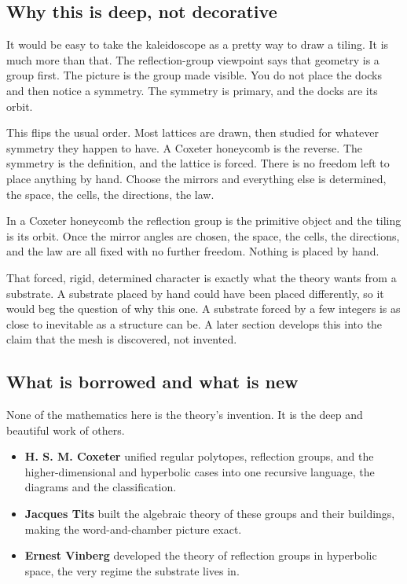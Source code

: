 \subsection{Why this is deep, not decorative}

It would be easy to take the kaleidoscope as a pretty way to draw a tiling. It is much more than that. The reflection-group viewpoint says that geometry is a group first. The picture is the group made visible. You do not place the docks and then notice a symmetry. The symmetry is primary, and the docks are its orbit.

This flips the usual order. Most lattices are drawn, then studied for whatever symmetry they happen to have. A Coxeter honeycomb is the reverse. The symmetry is the definition, and the lattice is forced. There is no freedom left to place anything by hand. Choose the mirrors and everything else is determined, the space, the cells, the directions, the law.

\begin{proposition}
In a Coxeter honeycomb the reflection group is the primitive object and the tiling is its orbit. Once the mirror angles are chosen, the space, the cells, the directions, and the law are all fixed with no further freedom. Nothing is placed by hand.
\end{proposition}

That forced, rigid, determined character is exactly what the theory wants from a substrate. A substrate placed by hand could have been placed differently, so it would beg the question of why this one. A substrate forced by a few integers is as close to inevitable as a structure can be. A later section develops this into the claim that the mesh is discovered, not invented.

\subsection{What is borrowed and what is new}

None of the mathematics here is the theory's invention. It is the deep and beautiful work of others.

\begin{itemize}
\item \textbf{H. S. M. Coxeter} unified regular polytopes, reflection groups, and the higher-dimensional and hyperbolic cases into one recursive language, the diagrams and the classification.
\item \textbf{Jacques Tits} built the algebraic theory of these groups and their buildings, making the word-and-chamber picture exact.
\item \textbf{Ernest Vinberg} developed the theory of reflection groups in hyperbolic space, the very regime the substrate lives in.
\end{itemize}

